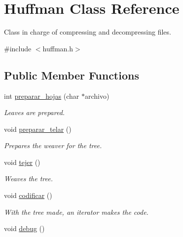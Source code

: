 \hypertarget{classHuffman}{}\section{Huffman Class Reference}
\label{classHuffman}


Class in charge of compressing and decompressing files.  




{\ttfamily \#include $<$huffman.\+h$>$}

\subsection*{Public Member Functions}
\begin{DoxyCompactItemize}
\item 
int \hyperlink{classHuffman_ac198c8fd7d49a8453f987254e1180e6f}{preparar\+\_\+hojas} (char $\ast$archivo)
\begin{DoxyCompactList}\small\item\em Leaves are prepared. \end{DoxyCompactList}\item 
void \hyperlink{classHuffman_af48ac0adffaf596525944160dab58f85}{preparar\+\_\+telar} ()\hypertarget{classHuffman_af48ac0adffaf596525944160dab58f85}{}\label{classHuffman_af48ac0adffaf596525944160dab58f85}

\begin{DoxyCompactList}\small\item\em Prepares the weaver for the tree. \end{DoxyCompactList}\item 
void \hyperlink{classHuffman_a6dd163a23c0bae9ad837fdac6ff02092}{tejer} ()\hypertarget{classHuffman_a6dd163a23c0bae9ad837fdac6ff02092}{}\label{classHuffman_a6dd163a23c0bae9ad837fdac6ff02092}

\begin{DoxyCompactList}\small\item\em Weaves the tree. \end{DoxyCompactList}\item 
void \hyperlink{classHuffman_af2e5dd5aee778931e06811f45ea61e6b}{codificar} ()\hypertarget{classHuffman_af2e5dd5aee778931e06811f45ea61e6b}{}\label{classHuffman_af2e5dd5aee778931e06811f45ea61e6b}

\begin{DoxyCompactList}\small\item\em With the tree made, an iterator makes the code. \end{DoxyCompactList}\item 
void \hyperlink{classHuffman_ab4c7fdb90d46c20bc9bb229e90bfbd5d}{debug} ()\hypertarget{classHuffman_ab4c7fdb90d46c20bc9bb229e90bfbd5d}{}\label{classHuffman_ab4c7fdb90d46c20bc9bb229e90bfbd5d}


\end{DoxyCompactItemize}
